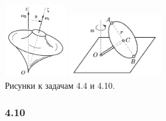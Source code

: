 \begin{center}
    \includegraphics[width=0.2\textwidth]{img/4_4.png}
    \hspace{3cm} 
    \includegraphics[width=0.3\textwidth]{img/4_10.png}\\
    Рисунки к задачам 4.4 и 4.10.
\end{center}

\subsubsection*{4.10}

